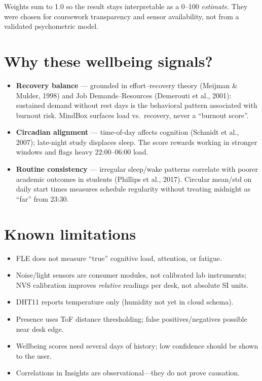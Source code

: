 \documentclass[11pt,a4paper]{report}
\begin{document}
Weights sum to 1.0 so the result stays interpretable as a 0--100 \emph{estimate}. They were
chosen for coursework transparency and sensor availability, not from a validated psychometric model.

\section{Why these wellbeing signals?}

\begin{itemize}[leftmargin=*]
  \item \textbf{Recovery balance} --- grounded in effort--recovery theory (Meijman \& Mulder, 1998)
        and Job Demands--Resources (Demerouti et al., 2001): sustained demand without rest days is
        the behavioral pattern associated with burnout risk. MindBox surfaces load vs.\ recovery,
        never a ``burnout score''.
  \item \textbf{Circadian alignment} --- time-of-day affects cognition (Schmidt et al., 2007);
        late-night study displaces sleep. The score rewards working in stronger windows and flags
        heavy 22:00--06:00 load.
  \item \textbf{Routine consistency} --- irregular sleep/wake patterns correlate with poorer
        academic outcomes in students (Phillips et al., 2017). Circular mean/std on daily
        start times measures schedule regularity without treating midnight as ``far'' from 23:30.
\end{itemize}

\section{Known limitations}

\begin{itemize}[leftmargin=*]
  \item FLE does not measure ``true'' cognitive load, attention, or fatigue.
  \item Noise/light sensors are consumer modules, not calibrated lab instruments; NVS calibration
        improves \emph{relative} readings per desk, not absolute SI units.
  \item DHT11 reports temperature only (humidity not yet in cloud schema).
  \item Presence uses ToF distance thresholding; false positives/negatives possible near desk edge.
  \item Wellbeing scores need several days of history; low confidence should be shown to the user.
  \item Correlations in Insights are observational---they do not prove causation.
\end{itemize}
\end{document}
